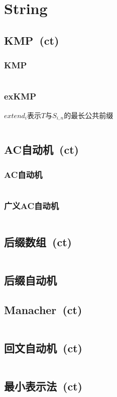 \chapter{String}
\section{KMP\ \small(ct)}
	\subsection*{KMP}
		\inputminted{cpp}{String/kmp.cpp}
	\subsection*{exKMP}
		$ extend_i $表示$ T $与$ S_{i,n} $的最长公共前缀
		\inputminted{cpp}{String/ex_kmp.cpp}
\section{AC自动机\ \small(ct)}
	\subsection*{AC自动机}
		\inputminted{cpp}{String/suffix_automaton.cpp}
	\subsection*{广义AC自动机}
		\inputminted{cpp}{String/general_suffix_automaton.cpp}
\section{后缀数组\ \small(ct)}
	\inputminted{cpp}{String/suffix_array.cpp}
\section{后缀自动机}
\section{Manacher\ \small(ct)}
	\inputminted{cpp}{String/manacher.cpp}
\section{回文自动机\ \small(ct)}
	\inputminted{cpp}{String/palindromic_tree.cpp}
\section{最小表示法\ \small(ct)}
	\inputminted{cpp}{String/minimal_rounding_string.cpp}